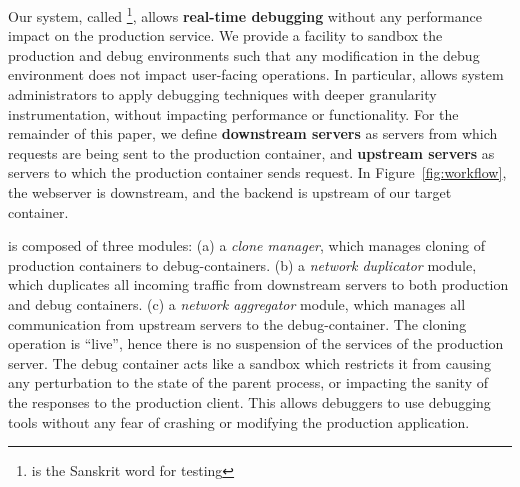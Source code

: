 
Our system, called \parikshan\footnote{\parikshan is the Sanskrit word for  testing}, allows \textbf{real-time debugging} without any performance impact on the production service. 
We provide a facility to sandbox the production and debug environments such that any modification in the debug environment does not impact user-facing operations.
In particular, \parikshan allows system administrators to apply debugging techniques with deeper granularity instrumentation, without impacting performance or functionality.
For the remainder of this paper, we define \textbf{downstream servers} as servers from which requests are being sent to the production container, and \textbf{upstream servers} as servers to which the production container sends request. 
In Figure~\ref{fig:workflow}, the webserver is downstream, and the backend is upstream of our target container.


\parikshan is composed of three modules:
(a) a \textit{clone manager}, which manages cloning of production containers to debug-containers.
(b) a \textit{network duplicator} module, which duplicates all incoming traffic from downstream servers to both production and debug containers.
(c) a \textit{network aggregator} module, which manages all communication from upstream servers to the debug-container.
The cloning operation is ``live'', hence there is no suspension of the services of the production server.
The debug container acts like a sandbox which restricts it from causing any perturbation to the state of the parent process, or impacting the sanity of the responses to the production client. 
This allows debuggers to use debugging tools without any fear of crashing or modifying the production application.

